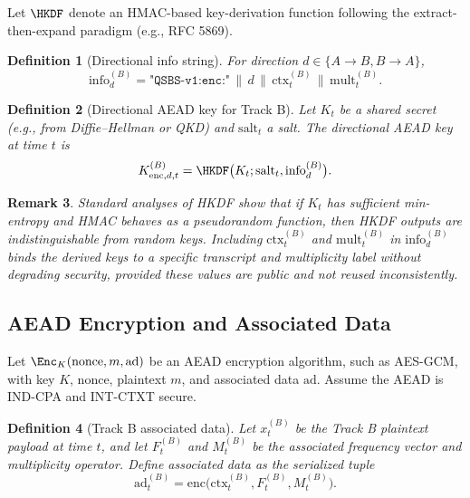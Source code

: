 \documentclass[11pt]{article}
\newtheorem{definition}{Definition}[section]
\newtheorem{remark}[definition]{Remark}
\begin{document}
Let \(\HKDF\) denote an HMAC-based key-derivation function following the extract-then-expand paradigm (e.g., RFC 5869).\cite{HKDFWiki,HKDFDotNet,GopherHKDF}

\begin{definition}[Directional info string]
For direction \(d \in \{A \to B, B \to A\}\),
\[
  \mathrm{info}_d^{(B)} =
    \texttt{"QSBS-v1:enc:"} \,\|\, d \,\|\, \mathrm{ctx}_t^{(B)} \,\|\, \mathrm{mult}_t^{(B)}.
\]
\end{definition}

\begin{definition}[Directional AEAD key for Track B]
Let \(K_t\) be a shared secret (e.g., from Diffie–Hellman or QKD) and \(\mathrm{salt}_t\) a salt.
The directional AEAD key at time \(t\) is
\[
  K_{\mathrm{enc},d,t}^{(B)} = \HKDF\bigl(K_t; \mathrm{salt}_t, \mathrm{info}_d^{(B)}\bigr).
\]
\end{definition}

\begin{remark}
Standard analyses of HKDF show that if \(K_t\) has sufficient min-entropy and HMAC behaves as a pseudorandom function, then HKDF outputs are indistinguishable from random keys.\cite{HKDFWiki,HKDFDotNet,GopherHKDF}
Including \(\mathrm{ctx}_t^{(B)}\) and \(\mathrm{mult}_t^{(B)}\) in \(\mathrm{info}_d^{(B)}\) binds the derived keys to a specific transcript and multiplicity label without degrading security, provided these values are public and not reused inconsistently.
\end{remark}

\subsection{AEAD Encryption and Associated Data}

Let \(\Enc_K(\mathrm{nonce}, m, \mathrm{ad})\) be an AEAD encryption algorithm, such as AES-GCM, with key \(K\), nonce, plaintext \(m\), and associated data \(\mathrm{ad}\).
Assume the AEAD is IND-CPA and INT-CTXT secure.

\begin{definition}[Track B associated data]
Let \(x_t^{(B)}\) be the Track B plaintext payload at time \(t\), and let \(F_t^{(B)}\) and \(M_t^{(B)}\) be the associated frequency vector and multiplicity operator.
Define associated data as the serialized tuple
\[
  \mathrm{ad}_t^{(B)} = \mathrm{enc}\bigl(\mathrm{ctx}_t^{(B)}, F_t^{(B)}, M_t^{(B)}\bigr).
\]
\end{definition}
\end{document}
